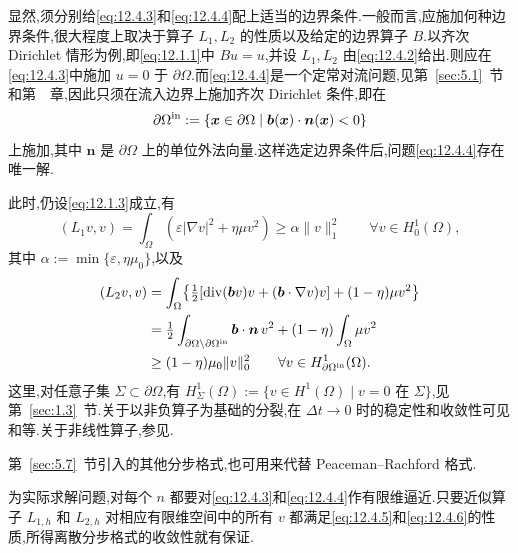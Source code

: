 显然,须分别给\eqref{eq:12.4.3}和\eqref{eq:12.4.4}配上适当的边界条件.一般而言,应施加何种边界条件,很大程度上取决于算子 \(L_1,L_2\) 的性质以及给定的边界算子 \(B\).以齐次 Dirichlet 情形为例,即\eqref{eq:12.1.1}中 \(Bu=u\),并设 \(L_1,L_2\) 由\eqref{eq:12.4.2}给出.则应在\eqref{eq:12.4.3}中施加 \(u=0\) 于 \(\partial\Omega\).而\eqref{eq:12.4.4}是一个定常对流问题,见第~\ref{sec:5.1}~节和第~~章,因此只须在流入边界上施加齐次 Dirichlet 条件,即在
\[
  \partial\Omega^{\rm in}:=\{\boldsymbol{x}\in\partial\Omega
       \mid \boldsymbol{b}(\boldsymbol{x})\cdot\boldsymbol{n}(\boldsymbol{x})<0\}
\]
上施加,其中 \(\boldsymbol{n}\) 是 \(\partial\Omega\) 上的单位外法向量.这样选定边界条件后,问题\eqref{eq:12.4.4}存在唯一解.

此时,仍设\eqref{eq:12.1.3}成立,有
\begin{equation}\label{eq:12.4.5}
  (L_1v,v)=\int_\Omega(\varepsilon|\nabla v|^2+\eta\mu v^2)
    \ge\alpha\|v\|_1^2\qquad\forall v\in H_0^1(\Omega),
\end{equation}
其中 \(\alpha:=\min\{\varepsilon,\eta\mu_0\}\),以及
\begin{equation}\label{eq:12.4.6}
  \begin{aligned}
    (L_2v,v)
      &=\int_\Omega\bigl\{\tfrac12[\operatorname{div}(\boldsymbol{b}v)v
           +(\boldsymbol{b}\cdot\nabla v)v]+(1-\eta)\mu v^2\bigr\}\\
      &=\tfrac12\int_{\partial\Omega\setminus\partial\Omega^{\rm in}}
         \boldsymbol{b}\cdot\boldsymbol{n}\,v^2+(1-\eta)\int_\Omega\mu v^2\\
      &\ge(1-\eta)\mu_0\|v\|_0^2\qquad\forall v\in H^1_{\partial\Omega^{\rm in}}(\Omega).
  \end{aligned}
\end{equation}
这里,对任意子集 \(\Sigma\subset\partial\Omega\),有 \(H_\Sigma^1(\Omega):=\{v\in H^1(\Omega)\mid v=0\text{ 在 }\Sigma\}\),见第~\ref{sec:1.3}~节.关于以非负算子为基础的分裂,在 \(\Delta t\to0\) 时的稳定性和收敛性可见和等.关于非线性算子,参见.

第~\ref{sec:5.7}~节引入的其他分步格式,也可用来代替 Peaceman--Rachford 格式.

为实际求解问题,对每个 \(n\) 都要对\eqref{eq:12.4.3}和\eqref{eq:12.4.4}作有限维逼近.只要近似算子 \(L_{1,h}\) 和 \(L_{2,h}\) 对相应有限维空间中的所有 \(v\) 都满足\eqref{eq:12.4.5}和\eqref{eq:12.4.6}的性质,所得离散分步格式的收敛性就有保证.

